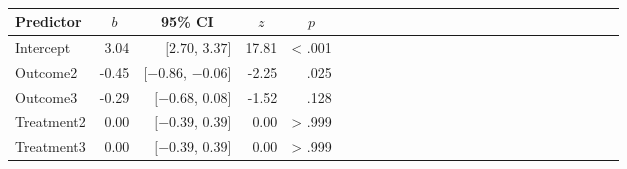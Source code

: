 \documentclass[man]{apa6}
\begin{document}
\begin{table}[tbp]
\begin{center}
\begin{threeparttable}
\caption{\label{tab:unnamed-chunk-10}}
\begin{tabular}{lrrrrlrrrrlrrrrlrrrrlrrrr}
\toprule
Predictor & \multicolumn{1}{c}{$b$} & \multicolumn{1}{c}{95\% CI} & \multicolumn{1}{c}{$z$} & \multicolumn{1}{c}{$p$}\\
\midrule
Intercept & 3.04 & $[2.70$, $3.37]$ & 17.81 & < .001\\
Outcome2 & -0.45 & $[-0.86$, $-0.06]$ & -2.25 & .025\\
Outcome3 & -0.29 & $[-0.68$, $0.08]$ & -1.52 & .128\\
Treatment2 & 0.00 & $[-0.39$, $0.39]$ & 0.00 & > .999\\
Treatment3 & 0.00 & $[-0.39$, $0.39]$ & 0.00 & > .999\\
\bottomrule
\end{tabular}
\end{threeparttable}
\end{center}
\end{table}
\end{document}
